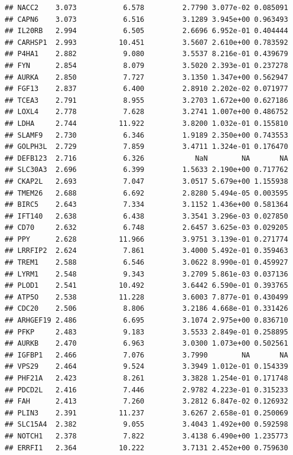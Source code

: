 \documentclass{article}\usepackage[]{graphicx}\usepackage[]{color}
\makeatletter
\newenvironment{kframe}{%
 \def\at@end@of@kframe{}%
 \ifinner\ifhmode%
  \def\at@end@of@kframe{\end{minipage}}%
  \begin{minipage}{\columnwidth}%
 \fi\fi%
 \def\FrameCommand##1{\hskip\@totalleftmargin \hskip-\fboxsep
 \colorbox{shadecolor}{##1}\hskip-\fboxsep
     \hskip-\linewidth \hskip-\@totalleftmargin \hskip\columnwidth}%
 \MakeFramed {\advance\hsize-\width
   \@totalleftmargin\z@ \linewidth\hsize
   \@setminipage}}%
 {\par\unskip\endMakeFramed%
 \at@end@of@kframe}
\newenvironment{knitrout}{}{} %
\makeatother
\begin{document}
\begin{knitrout}
\begin{kframe}
\begin{verbatim}
## NACC2    3.073           6.578         2.7790 3.077e-02 0.085091
## CAPN6    3.073           6.516         3.1289 3.945e+00 0.963493
## IL20RB   2.994           6.505         2.6696 6.952e-01 0.404444
## CARHSP1  2.993          10.451         3.5607 2.610e+00 0.783592
## P4HA1    2.882           9.080         3.5537 8.216e-01 0.439679
## FYN      2.854           8.079         3.5020 2.393e-01 0.237278
## AURKA    2.850           7.727         3.1350 1.347e+00 0.562947
## FGF13    2.837           6.400         2.8910 2.202e-02 0.071977
## TCEA3    2.791           8.955         3.2703 1.672e+00 0.627186
## LOXL4    2.778           7.628         3.2741 1.007e+00 0.486752
## LDHA     2.744          11.922         3.8200 1.032e-01 0.155810
## SLAMF9   2.730           6.346         1.9189 2.350e+00 0.743553
## GOLPH3L  2.729           7.859         3.4711 1.324e-01 0.176470
## DEFB123  2.716           6.326            NaN        NA       NA
## SLC30A3  2.696           6.399         1.5633 2.190e+00 0.717762
## CKAP2L   2.693           7.047         3.0517 5.679e+00 1.155938
## TMEM26   2.688           6.692         2.8280 5.494e-05 0.003595
## BIRC5    2.643           7.334         3.1152 1.436e+00 0.581364
## IFT140   2.638           6.438         3.3541 3.296e-03 0.027850
## CD70     2.632           6.748         2.6457 3.625e-03 0.029205
## PPY      2.628          11.966         3.9751 3.139e-01 0.271774
## LRRFIP2  2.624           7.861         3.4000 5.492e-01 0.359463
## TREM1    2.588           6.546         3.0622 8.990e-01 0.459927
## LYRM1    2.548           9.343         3.2709 5.861e-03 0.037136
## PLOD1    2.541          10.492         3.6442 6.590e-01 0.393765
## ATP5O    2.538          11.228         3.6003 7.877e-01 0.430499
## CDC20    2.506           8.806         3.2186 4.668e-01 0.331426
## ARHGEF19 2.486           6.695         3.1074 2.975e+00 0.836710
## PFKP     2.483           9.183         3.5533 2.849e-01 0.258895
## AURKB    2.470           6.963         3.0300 1.073e+00 0.502561
## IGFBP1   2.466           7.076         3.7990        NA       NA
## VPS29    2.464           9.524         3.3949 1.012e-01 0.154339
## PHF21A   2.423           8.261         3.3828 1.254e-01 0.171748
## PDCD2L   2.416           7.446         2.9782 4.223e-01 0.315233
## FAH      2.413           7.260         3.2812 6.847e-02 0.126932
## PLIN3    2.391          11.237         3.6267 2.658e-01 0.250069
## SLC15A4  2.382           9.055         3.4043 1.492e+00 0.592598
## NOTCH1   2.378           7.822         3.4138 6.490e+00 1.235773
## ERRFI1   2.364          10.222         3.7131 2.452e+00 0.759630

\end{verbatim}
\end{kframe}
\end{knitrout}
\end{document}
